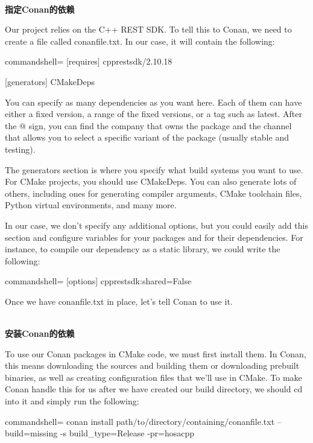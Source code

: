 \hspace*{\fill} \\ %
\noindent
\textbf{指定Conan的依赖}

Our project relies on the C++ REST SDK. To tell this to Conan, we need to create a file called conanfile.txt. In our case, it will contain the following:

\begin{tcblisting}{commandshell={}}
[requires]
cpprestsdk/2.10.18

[generators]
CMakeDeps
\end{tcblisting}

You can specify as many dependencies as you want here. Each of them can have either a fixed version, a range of the fixed versions, or a tag such as latest. After the @ sign, you can find the company that owns the package and the channel that allows you to select a specific variant of the package (usually stable and testing).

The generators section is where you specify what build systems you want to use. For CMake projects, you should use CMakeDeps. You can also generate lots of others, including ones for generating compiler arguments, CMake toolchain files, Python virtual environments, and many more.

In our case, we don't specify any additional options, but you could easily add this section and configure variables for your packages and for their dependencies. For instance, to compile our dependency as a static library, we could write the following:

\begin{tcblisting}{commandshell={}}
[options]
cpprestsdk:shared=False
\end{tcblisting}

Once we have conanfile.txt in place, let's tell Conan to use it.

\hspace*{\fill} \\ %
\noindent
\textbf{安装Conan的依赖}

To use our Conan packages in CMake code, we must first install them. In Conan, this means downloading the sources and building them or downloading prebuilt binaries, as well as creating configuration files that we'll use in CMake. To make Conan handle this for us after we have created our build directory, we should cd into it and simply run the following:

\begin{tcblisting}{commandshell={}}
conan install path/to/directory/containing/conanfile.txt --build=missing -s
build_type=Release -pr=hosacpp
\end{tcblisting}

